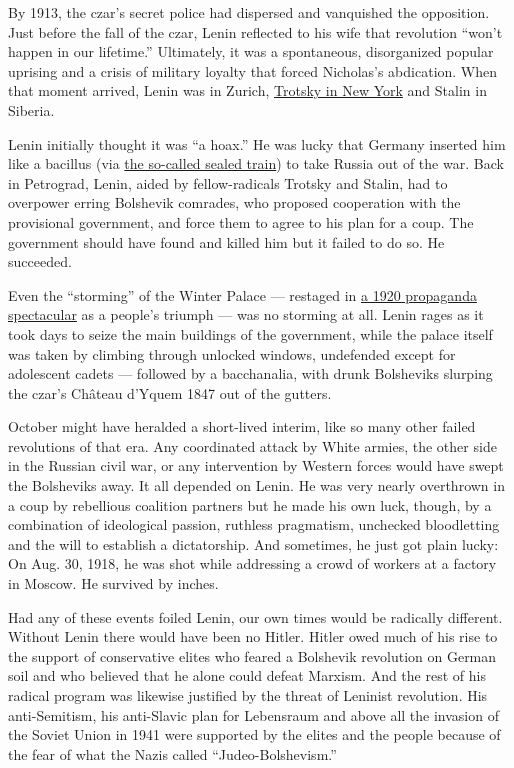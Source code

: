 By 1913, the czar's secret police had dispersed and vanquished the
opposition. Just before the fall of the czar, Lenin reflected to his
wife that revolution ``won't happen in our lifetime.'' Ultimately, it
was a spontaneous, disorganized popular uprising and a crisis of
military loyalty that forced Nicholas's abdication. When that moment
arrived, Lenin was in Zurich,
\href{https://www.jacobinmag.com/2016/10/trotsky-new-york-socialist-party-debs-revolution/}{Trotsky
in New York} and Stalin in Siberia.

Lenin initially thought it was ``a hoax.'' He was lucky that Germany
inserted him like a bacillus (via
\href{https://www.nytimes3xbfgragh.onion/2017/06/19/opinion/was-lenin-a-german-agent.html}{the
so-called sealed train}) to take Russia out of the war. Back in
Petrograd, Lenin, aided by fellow-radicals Trotsky and Stalin, had to
overpower erring Bolshevik comrades, who proposed cooperation with the
provisional government, and force them to agree to his plan for a coup.
The government should have found and killed him but it failed to do so.
He succeeded.

Even the ``storming'' of the Winter Palace --- restaged in
\href{https://www.youtube.com/watch?v=fLihunxEzwE}{a 1920 propaganda
spectacular} as a people's triumph --- was no storming at all. Lenin
rages as it took days to seize the main buildings of the government,
while the palace itself was taken by climbing through unlocked windows,
undefended except for adolescent cadets --- followed by a bacchanalia,
with drunk Bolsheviks slurping the czar's Château d'Yquem 1847 out of
the gutters.

October might have heralded a short-lived interim, like so many other
failed revolutions of that era. Any coordinated attack by White armies,
the other side in the Russian civil war, or any intervention by Western
forces would have swept the Bolsheviks away. It all depended on Lenin.
He was very nearly overthrown in a coup by rebellious coalition partners
but he made his own luck, though, by a combination of ideological
passion, ruthless pragmatism, unchecked bloodletting and the will to
establish a dictatorship. And sometimes, he just got plain lucky: On
Aug. 30, 1918, he was shot while addressing a crowd of workers at a
factory in Moscow. He survived by inches.

Had any of these events foiled Lenin, our own times would be radically
different. Without Lenin there would have been no Hitler. Hitler owed
much of his rise to the support of conservative elites who feared a
Bolshevik revolution on German soil and who believed that he alone could
defeat Marxism. And the rest of his radical program was likewise
justified by the threat of Leninist revolution. His anti-Semitism, his
anti-Slavic plan for Lebensraum and above all the invasion of the Soviet
Union in 1941 were supported by the elites and the people because of the
fear of what the Nazis called ``Judeo-Bolshevism.''

